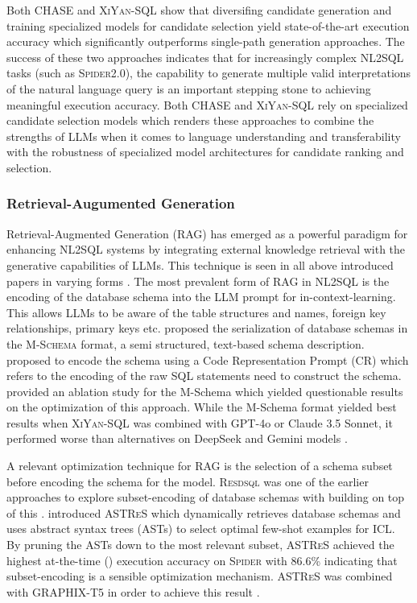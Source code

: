 \documentclass{article}
\begin{document}
Both CHASE and \textsc{XiYan-SQL} show that diversifing candidate generation and training specialized models for candidate
selection yield state-of-the-art execution accuracy which significantly outperforms single-path generation approaches.
The success of these two approaches indicates that for increasingly complex NL2SQL tasks (such as \textsc{Spider2.0}),
the capability to generate multiple valid interpretations of the natural language query is an important stepping stone
to achieving meaningful execution accuracy. Both CHASE and \textsc{XiYan-SQL} rely on specialized candidate selection
models which renders these approaches to combine the strengths of LLMs when it comes to language understanding and
transferability with the robustness of specialized model architectures for candidate ranking and selection.


\subsubsection{Retrieval-Augumented Generation}

Retrieval-Augmented Generation (RAG) has emerged as a powerful paradigm for enhancing NL2SQL systems by integrating
external knowledge retrieval with the generative capabilities of LLMs. This technique is seen in all above introduced
papers in varying forms \citep{XiYan, CHASE, CoE-SQL, MAGIC, DINSQL, DAIL-SQL}. The most prevalent form of RAG in
NL2SQL is the encoding of the database schema into the LLM prompt for in-context-learning. This allows LLMs to be
aware of the table structures and names, foreign key relationships, primary keys etc. \cite{XiYan} proposed the
serialization of database schemas in the \textsc{M-Schema} format, a semi structured, text-based schema description.
\cite{DAIL-SQL} proposed to encode the schema using a Code Representation Prompt (CR) which refers to the encoding of
the raw SQL statements need to construct the schema. \cite{XiYan} provided an ablation study for the M-Schema which
yielded questionable results on the optimization of this approach. While the M-Schema format yielded best results when
\textsc{XiYan-SQL} was combined with GPT-4o or Claude 3.5 Sonnet, it performed worse than alternatives on DeepSeek
and Gemini models \citep{XiYan}.

A relevant optimization technique for RAG is the selection of a schema subset before encoding the schema for the model.
\textsc{Resdsql} was one of the earlier approaches to explore subset-encoding of database schemas with \cite{RetAug}
building on top of this \citep{RetAug, RESDSQL}. \cite{RetAug} introduced \textsc{ASTReS} which dynamically
retrieves database schemas and uses abstract syntax trees (ASTs) to select optimal few-shot examples for ICL. 
By pruning the ASTs down to the most relevant subset, \textsc{ASTReS} achieved the highest at-the-time (\citeyear{RetAug})
execution accuracy on \textsc{Spider} with 86.6\% indicating that subset-encoding is a sensible optimization mechanism.
\textsc{ASTReS} was combined with GRAPHIX-T5 in order to achieve this result \citep{RetAug}.
\end{document}
